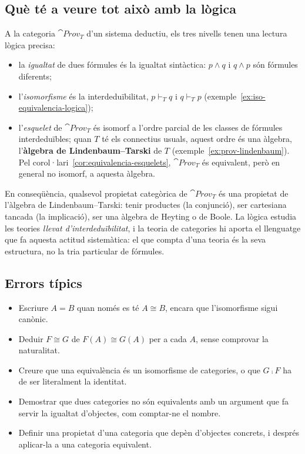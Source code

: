 \subsection{Què té a veure tot això amb la lògica}

A la categoria $\cat{Prov}_T$ d'un sistema deductiu, els tres nivells tenen una lectura lògica precisa:
\begin{itemize}
\item la \emph{igualtat} de dues fórmules és la igualtat sintàctica: $p\land q$ i $q\land p$ són fórmules diferents;
\item l'\emph{isomorfisme} és la interdeduïbilitat, $p\vdash_T q$ i $q\vdash_T p$ (exemple~\ref{ex:iso-equivalencia-logica});
\item l'\emph{esquelet} de $\cat{Prov}_T$ és isomorf a l'ordre parcial de les classes de fórmules interdeduïbles; quan $T$ té els connectius usuals, aquest ordre és una àlgebra, l'\textbf{àlgebra de Lindenbaum--Tarski} de $T$ (exemple~\ref{ex:prov-lindenbaum}). Pel corol·lari~\ref{cor:equivalencia-esquelets}, $\cat{Prov}_T$ és equivalent, però en general no isomorf, a aquesta àlgebra.
\end{itemize}
En conseqüència, qualsevol propietat categòrica de $\cat{Prov}_T$ és una propietat de l'àlgebra de Lindenbaum--Tarski: tenir productes (la conjunció), ser cartesiana tancada (la implicació), ser una àlgebra de Heyting o de Boole. La lògica estudia les teories \emph{llevat d'interdeduïbilitat}, i la teoria de categories hi aporta el llenguatge que fa aquesta actitud sistemàtica: el que compta d'una teoria és la seva estructura, no la tria particular de fórmules.

\subsection{Errors típics}

\begin{itemize}
\item Escriure $A=B$ quan només es té $A\cong B$, encara que l'isomorfisme sigui canònic.
\item Deduir $F\cong G$ de $F(A)\cong G(A)$ per a cada $A$, sense comprovar la naturalitat.
\item Creure que una equivalència és un isomorfisme de categories, o que $G\comp F$ ha de ser literalment la identitat.
\item Demostrar que dues categories no són equivalents amb un argument que fa servir la igualtat d'objectes, com comptar-ne el nombre.
\item Definir una propietat d'una categoria que depèn d'objectes concrets, i després aplicar-la a una categoria equivalent.
\end{itemize}

